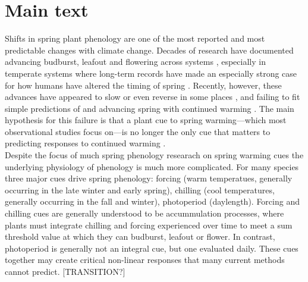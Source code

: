 \documentclass[11pt,letter]{article}
\begin{document}
\section{Main text}
Shifts in spring plant phenology are one of the most reported and most predictable changes with climate change. Decades of research have documented advancing budburst, leafout and flowering across systems \citep{delpierre2009, yu2010,Ellwood2012,jochner2013,hereford2017}, especially in temperate systems where long-term records have made an especially strong case for how humans have altered the timing of spring \citep{Schwartz:1997nn,Menzel2003a,Menzel:2006sq}. Recently, however, these advances have appeared to slow \citep{fu2015} or even reverse in some places \citep{yu2010}, and failing to fit simple predictions of and advancing spring with continued warming \citep{Ellwood2012}. The main hypothesis for this failure is that a plant cue to spring warming---which most observational studies focus on---is no longer the only cue that matters to predicting responses to continued warming \citep{chuine2016}.\\ %

Despite the focus of much spring phenology researach on spring warming cues the underlying physiology of phenology is much more complicated. For many species three major cues drive spring phenology: forcing (warm temperatues, generally occurring in the late winter and early spring), chilling (cool temperatures, generally occurring in the fall and winter), photoperiod (daylength). Forcing and chilling cues are generally understood to be accummulation processes, where plants must integrate chilling and forcing experienced over time to meet a sum threshold value at which they can budburst, leafout or flower. In contrast, photoperiod is generally not an integral cue, but one evaluated daily. These cues together may create critical non-linear responses that many current methods cannot predict. [TRANSITION?]\\
\end{document}
